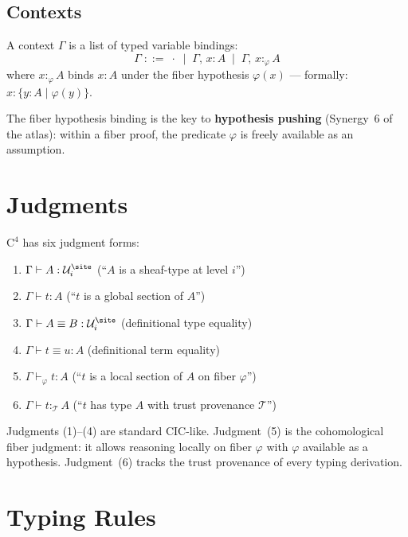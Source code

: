 \subsection{Contexts}

A context \(\Gamma\) is a list of typed variable bindings:
\[
  \Gamma \;::=\; \cdot \;\mid\; \Gamma,\, x : A \;\mid\;
  \Gamma,\, x :_\varphi A
\]
where \(x :_\varphi A\) binds \(x : A\) under the fiber hypothesis
\(\varphi(x)\) --- formally: \(x : \{y : A \mid \varphi(y)\}\).

The fiber hypothesis binding is the key to \textbf{hypothesis pushing}
(Synergy~6 of the atlas): within a fiber proof, the predicate \(\varphi\)
is freely available as an assumption.


\section{Judgments}
\label{sec:judgments}

\(\mathrm{C}^4\) has six judgment forms:

\begin{enumerate}
\item \(\Gamma \vdash A : \mathcal{U}_i^{\site}\)
  \hfill (``\(A\) is a sheaf-type at level \(i\)'')
\item \(\Gamma \vdash t : A\)
  \hfill (``\(t\) is a global section of \(A\)'')
\item \(\Gamma \vdash A \equiv B : \mathcal{U}_i^{\site}\)
  \hfill (definitional type equality)
\item \(\Gamma \vdash t \equiv u : A\)
  \hfill (definitional term equality)
\item \(\Gamma \vdash_\varphi t : A\)
  \hfill (``\(t\) is a local section of \(A\) on fiber \(\varphi\)'')
\item \(\Gamma \vdash t :_\mathcal{T} A\)
  \hfill (``\(t\) has type \(A\) with trust provenance \(\mathcal{T}\)'')
\end{enumerate}

Judgments (1)--(4) are standard CIC-like.  Judgment~(5) is the
cohomological fiber judgment: it allows reasoning locally on fiber
\(\varphi\) with \(\varphi\) available as a hypothesis.
Judgment~(6) tracks the trust provenance of every typing derivation.


\section{Typing Rules}
\label{sec:typing-rules}

